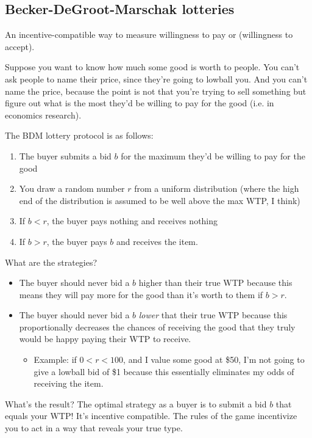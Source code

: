 \documentclass[11pt]{article}
\begin{document}
\subsection{Becker-DeGroot-Marschak lotteries}

An incentive-compatible way to measure willingness to pay or (willingness to accept).

Suppose you want to know how much some good is worth to people. You can't ask people to name their price, since they're going to lowball you. And you can't name the price, because the point is not that you're trying to sell something but figure out what is the most they'd be willing to pay for the good (i.e. in economics research).

The BDM lottery protocol is as follows:
\begin{enumerate}
    \item The buyer submits a bid $b$ for the maximum they'd be willing to pay for the good
    \item You draw a random number $r$ from a uniform distribution (where the high end of the distribution is assumed to be well above the max WTP, I think)
    \item If $b < r$, the buyer pays nothing and receives nothing
    \item If $b > r$, the buyer pays $b$ and receives the item.
\end{enumerate}

What are the strategies?
\begin{itemize}
    \item The buyer should never bid a $b$ higher than their true WTP because this means they will pay more for the good than it's worth to them if $b > r$.
    \item The buyer should never bid a $b$ {\it lower} that their true WTP because this proportionally decreases the chances of receiving the good that they truly would be happy paying their WTP to receive. 
    \begin{itemize}
        \item Example: if $ 0 < r < 100$, and I value some good at \$50, I'm not going to give a lowball bid of \$1 because this essentially eliminates my odds of receiving the item.
    \end{itemize}
\end{itemize}

What's the result? The optimal strategy as a buyer is to submit a bid $b$ that equals your WTP! It's incentive compatible. The rules of the game incentivize you to act in a way that reveals your true type. 
\end{document}
